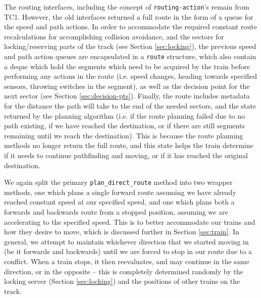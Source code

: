 \documentclass[12pt, titlepage]{article}
\begin{document}
    The routing interfaces, including the concept of \verb`routing-action`'s remain from TC1. However, the old interfaces returned a full route in the form of a queue for the speed and path actions. In order to accommodate the required constant route recalculations for accomplishing collision avoidance, and the sectors for locking/reserving parts of the track (see Section \ref{sec:locking}), the previous speed and path action queues are encapsulated in a \verb`route` structure, which also contain a deque which hold the segments which need to be acquired by the train before performing any actions in the route (i.e. speed changes, heading towards specified sensors, throwing switches in the segment), as well as the decision point for the next sector (see Section \ref{sec:decision-pts}). Finally, the route includes metadata for the distance the path will take to the end of the needed sectors, and the state returned by the planning algorithm (i.e. if the route planning failed due to no path existing, if we have reached the destination, or if there are still segments remaining until we reach the destination). This is because the route planning methods no longer return the full route, and this state helps the train determine if it needs to continue pathfinding and moving, or if it has reached the original destination. 
    
    We again split the primary \verb`plan_direct_route` method into two wrapper methods, one which plans a single forward route assuming we have already reached constant speed at our specified speed, and one which plans both a forwards and backwards route from a stopped position, assuming we are accelerating to the specified speed. This is to better accommodate our trains and how they desire to move, which is discussed further in Section \ref{sec:train}. In general, we attempt to maintain whichever direction that we started moving in (be it forwards and backwards) until we are forced to stop in our route due to a conflict. When a train stops, it then reevaluates, and may continue in the same direction, or in the opposite -- this is completely determined randomly by the locking server (Section \ref{sec:locking}) and the positions of other trains on the track.
    
\end{document}
